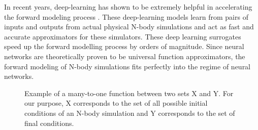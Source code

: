 \documentclass[10pt]{article}
\begin{document}
In recent years, deep-learning has shown to be extremely helpful in accelerating the forward modeling process \cite{he_li_feng_ho_ravanbakhsh_chen_póczos_2019}. These deep-learning models learn from pairs of inputs and outputs from actual physical N-body simulations and act as fast and accurate approximators for these simulators. These deep learning surrogates speed up the forward modelling process by orders of magnitude. Since neural networks are theoretically proven to be universal function approximators, the forward modeling of N-body simulations fits perfectly into the regime of neural networks.

\begin{figure}
    \caption{Example of a many-to-one function between two sets X and Y. For our purpose, X corresponds to the set of all possible initial conditions of an N-body simulation and Y corresponds to the set of final conditions.}
    \label{manytoone}
\end{figure}
\end{document}
